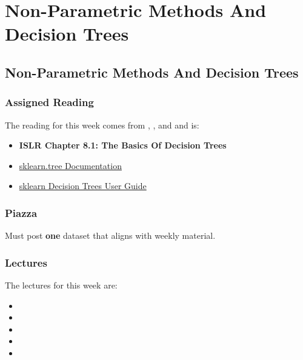 \clearpage

\renewcommand{\ChapTitle}{Non-Parametric Methods And Decision Trees}
\renewcommand{\SectionTitle}{Non-Parametric Methods And Decision Trees}

\chapter{\ChapTitle}
\section{\SectionTitle}

\subsection{Assigned Reading}

The reading for this week comes from \ISLRPython, \ISLRR, and \ESLII \hspace*{1pt} and is:

\begin{itemize}
    \item \textbf{ISLR Chapter 8.1: The Basics Of Decision Trees}
    \item \href{https://scikit-learn.org/stable/modules/generated/sklearn.tree.DecisionTreeClassifier.html}{sklearn.tree Documentation}
    \item \href{https://scikit-learn.org/stable/modules/tree.html#minimal-cost-complexity-pruning}{sklearn Decision Trees User Guide}
\end{itemize}

\subsection{Piazza}

Must post \textbf{one} dataset that aligns with weekly material.

\subsection{Lectures}

The lectures for this week are:

\begin{itemize}
    \item {}
    \item {}
    \item {}
    \item {}
    \item {}
\end{itemize}

